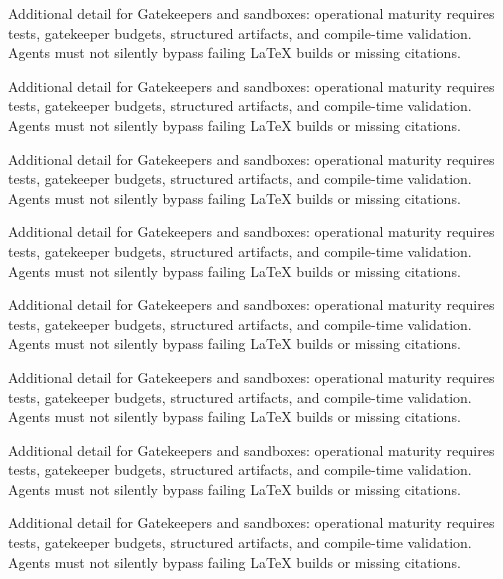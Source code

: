 Additional detail for Gatekeepers and sandboxes: operational maturity requires tests, gatekeeper budgets, structured artifacts, and compile-time validation. Agents must not silently bypass failing LaTeX builds or missing citations. \cite{crewai2024} \cite{langgraph2024} \cite{mcp2024}

Additional detail for Gatekeepers and sandboxes: operational maturity requires tests, gatekeeper budgets, structured artifacts, and compile-time validation. Agents must not silently bypass failing LaTeX builds or missing citations. \cite{crewai2024} \cite{langgraph2024} \cite{mcp2024}

Additional detail for Gatekeepers and sandboxes: operational maturity requires tests, gatekeeper budgets, structured artifacts, and compile-time validation. Agents must not silently bypass failing LaTeX builds or missing citations. \cite{crewai2024} \cite{langgraph2024} \cite{mcp2024}

Additional detail for Gatekeepers and sandboxes: operational maturity requires tests, gatekeeper budgets, structured artifacts, and compile-time validation. Agents must not silently bypass failing LaTeX builds or missing citations. \cite{crewai2024} \cite{langgraph2024} \cite{mcp2024}

Additional detail for Gatekeepers and sandboxes: operational maturity requires tests, gatekeeper budgets, structured artifacts, and compile-time validation. Agents must not silently bypass failing LaTeX builds or missing citations. \cite{crewai2024} \cite{langgraph2024} \cite{mcp2024}

Additional detail for Gatekeepers and sandboxes: operational maturity requires tests, gatekeeper budgets, structured artifacts, and compile-time validation. Agents must not silently bypass failing LaTeX builds or missing citations. \cite{crewai2024} \cite{langgraph2024} \cite{mcp2024}

Additional detail for Gatekeepers and sandboxes: operational maturity requires tests, gatekeeper budgets, structured artifacts, and compile-time validation. Agents must not silently bypass failing LaTeX builds or missing citations. \cite{crewai2024} \cite{langgraph2024} \cite{mcp2024}

Additional detail for Gatekeepers and sandboxes: operational maturity requires tests, gatekeeper budgets, structured artifacts, and compile-time validation. Agents must not silently bypass failing LaTeX builds or missing citations. \cite{crewai2024} \cite{langgraph2024} \cite{mcp2024}

